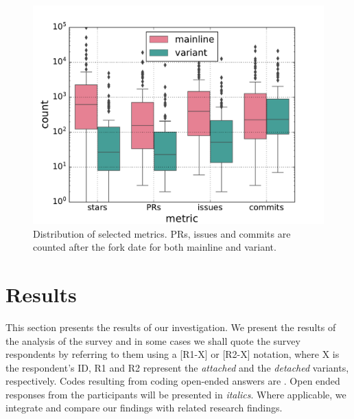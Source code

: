 

\begin{figure}[ht]
\begin{center}
    \centering
    \includegraphics[width=\columnwidth]{pdfs/stats.pdf}
    \caption{Distribution of selected metrics. PRs, issues and commits are counted after the fork date for both mainline and variant.}
    \label{fig:stats}
\end{center}
\vspace{-.3cm}
\end{figure}
\section{Results}
\label{sec:results}


This section presents the results of our investigation.
We present the results of the analysis of the survey and in some cases we shall quote the survey respondents by referring to them using a [R1-X] or [R2-X]
notation, where X is the respondent’s ID, R1 and R2 represent the \textit{attached} and the \textit{detached} variants, respectively. Codes resulting from coding open-ended answers are .
Open ended responses from the participants will be presented in \emph{italics}.
Where applicable, we integrate and compare our findings with related research findings. 

